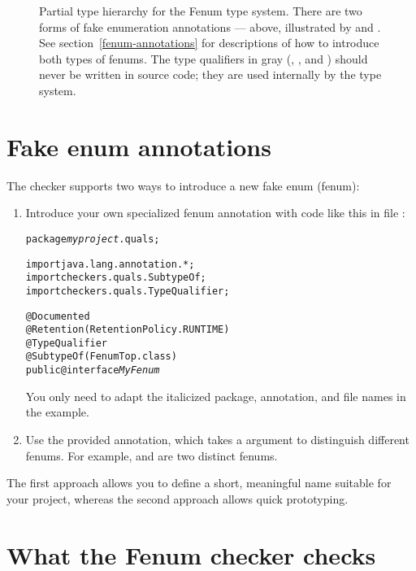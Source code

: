 \begin{figure}
\caption{Partial type hierarchy for the Fenum type system.
There are two forms of fake enumeration annotations --- above, illustrated
by  and .
See section~\ref{fenum-annotations} for descriptions of how to
introduce both types of fenums. The type qualifiers in gray
(, , and )
should never be written in
source code; they are used internally by the type system.}
\label{fig:fenum-hierarchy}
\end{figure}

\section{Fake enum annotations\label{fenum-annotations}}

The checker supports two ways to introduce a new fake enum (fenum):

\begin{enumerate}
\item Introduce your own specialized fenum annotation with code like this in
file :

\begin{alltt}
package \textit{myproject}.quals;

import java.lang.annotation.*;
import checkers.quals.SubtypeOf;
import checkers.quals.TypeQualifier;

@Documented
@Retention(RetentionPolicy.RUNTIME)
@TypeQualifier
@SubtypeOf( \ttlcb{} FenumTop.class \ttrcb{} )
public @interface \textit{MyFenum} \ttlcb\ttrcb
\end{alltt}

You only need to adapt the italicized package, annotation, and file names in the example.


\item Use the provided  annotation, which takes a
 argument to distinguish different fenums.
For example,  and  are two distinct fenums.
\end{enumerate}


The first approach allows you to define a short, meaningful name suitable for
your project, whereas the second approach allows quick prototyping.



\section{What the Fenum checker checks\label{fenum-checks}}

